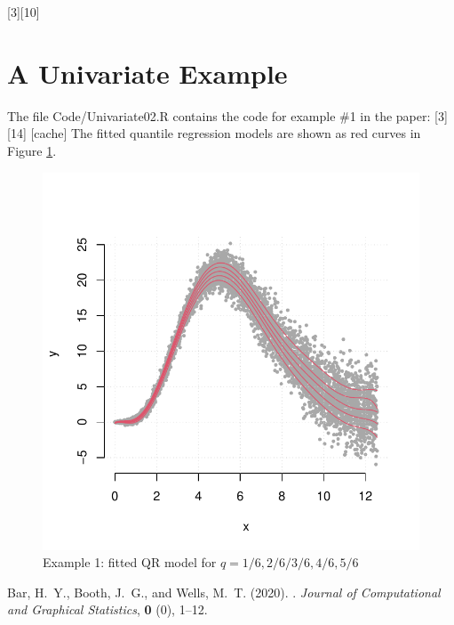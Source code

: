 \documentclass[a4paper,12pt]{article}
\begin{document}
[3][10]

\section{A Univariate Example}
The file Code/Univariate02.R  contains the code for example \#1 in the paper: 
[3][14]
[cache]
The fitted quantile regression models are shown as red curves in Figure \ref{Example1}.

\begin{figure}[b!]
\centering
\includegraphics[width=.6\linewidth]{Figures/Uni02.pdf}
\caption{Example 1: fitted QR model for $q=1/6,2/6/3/6,4/6,5/6$}\label{Example1}
\end{figure} 
 



\begin{thebibliography}{99}
{\rm Bar, H.~Y., Booth, J.~G., {\rm and} Wells, M.~T.} (2020).
.
\newblock \emph{Journal of Computational and Graphical Statistics}, {\bf  0} (0),  1--12.
\end{thebibliography}
\end{document}
